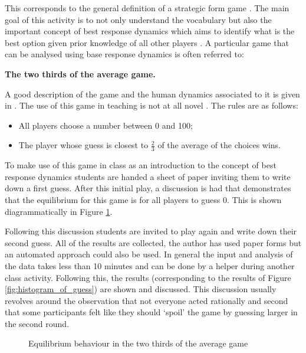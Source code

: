\documentclass{article}
\begin{document}
This corresponds to the general definition of a strategic form game
\cite{Maschler2013}. The main goal of this activity is to not only understand
the vocabulary but also the important concept of best response dynamics which
aims to identify what is the best option given prior knowledge of all other
players \cite{Maschler2013}. A particular game that can be analysed using base
response dynamics is often referred to:

\begin{center}
    \textbf{The two thirds of the average game.}
\end{center}

A good description of the game and the human dynamics associated to it is given
in \cite{Nagel1995}. The use of this game in teaching is not at all novel
\cite{TheEconomicsNetwork2013}. The rules are as follows:

\begin{itemize}
    \item All players choose a number between 0 and 100;
    \item The player whose guess is closest to \(\frac{2}{3}\) of the average
        of the choices wins.
\end{itemize}

To make use of this game in class as an introduction to the concept of best
response dynamics students are handed a sheet of paper inviting them to write
down a first guess. After this initial play, a discussion is had that
demonstrates that the equilibrium for this game is for all players to guess 0.
This is shown diagrammatically in Figure
\ref{fig:rationalisation_of_two_thirds_game}.

Following this discussion students are invited to play again and write down
their second guess. All of the results are collected, the author has used paper
forms but an automated approach could also be used. In general the input and
analysis of the data takes less than 10 minutes and can be done by a helper
during another class activity.
Following this, the results (corresponding to the results of Figure
\ref{fig:histogram_of_guess}) are shown and discussed.
This discussion usually revolves around the observation that not everyone acted
rationally and second that some participants felt like they should `spoil' the
game by guessing larger in the second round.

\begin{figure}[!hbtp]
    \centering
        
    \caption{Equilibrium behaviour in the two thirds of the average
    game}\label{fig:rationalisation_of_two_thirds_game}
\end{figure}
\end{document}
